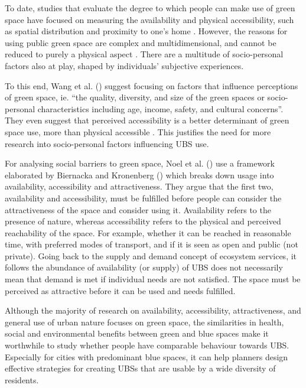 \documentclass{article}
\begin{document}
To date, studies that evaluate the degree to which people can make use of green space have focused on measuring the availability and physical accessibility, such as spatial distribution and proximity to one's home \parencite{REF}.
However, the reasons for using public green space are complex and multidimensional, and cannot be reduced to purely a physical aspect \parencite{wang2015physical}. There are a multitude of socio-personal factors also at play, shaped by individuals' subjective experiences. %

To this end, Wang et al. (\citeyear{wang2015physical}) suggest focusing on factors that influence perceptions of green space, ie. ``the quality, diversity, and size of the green spaces or socio-personal characteristics including age, income, safety, and cultural concerns''. They even suggest that perceived accessibility is a better determinant of green space use, more than physical accessible \parencite{wang2015comparison}. This justifies the need for more research into socio-personal factors influencing UBS use.

For analysing social barriers to green space, Noel et al. (\citeyear{noel2021social}) use a framework elaborated by Biernacka and Kronenberg (\citeyear{biernacka2018classification}) which breaks down usage into availability, accessibility and attractiveness. They argue that the first two, availability and accessibility, must be fulfilled before people can consider the attractiveness of the space and consider using it.
Availability refers to the presence of nature, whereas accessibility refers to the physical and perceived reachability of the space. For example, whether it can be reached in reasonable time, with preferred modes of transport, and if it is seen as open and public (not private). Going back to the supply and demand concept of ecosystem services, it follows the abundance of availability (or supply) of UBS does not necessarily mean that demand is met if individual needs are not satisfied. The space must be perceived as attractive before it can be used and needs fulfilled.

Although the majority of research on availability, accessibility, attractiveness, and general use of urban nature focuses on green space, the similarities in health, social and environmental benefits between green and blue spaces make it worthwhile to study whether people have comparable behaviour towards UBS. Especially for cities with predominant blue spaces, it can help planners design effective strategies for creating UBSs that are usable by a wide diversity of residents.
\end{document}

